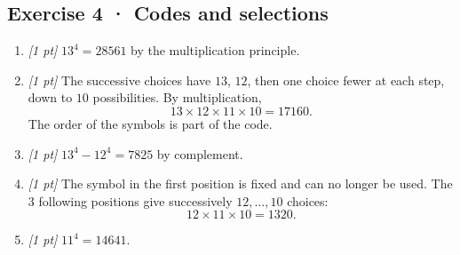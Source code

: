 \subsection*{Exercise 4 · Codes and selections}\begin{enumerate}

\item \textit{[1 pt]} $13^4=28561$ by the multiplication principle.

\item \textit{[1 pt]} The successive choices have $13$, $12$, then one choice fewer at each step, down to $10$ possibilities. By multiplication,
\[13\times12\times11\times10=17160.\]
The order of the symbols is part of the code.

\item \textit{[1 pt]} $13^4-12^4=7825$ by complement.

\item \textit{[1 pt]} The symbol in the first position is fixed and can no longer be used. The $3$ following positions give successively $12,\ldots,10$ choices:
\[12\times11\times10=1320.\]

\item \textit{[1 pt]} $11^4=14641$.

\end{enumerate}

\fi

\fi

